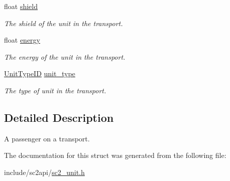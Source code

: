 \begin{DoxyCompactItemize}
float \hyperlink{structsc2_1_1_passenger_unit_a8e79587e7907106cde23a76e2db4d1fd}{shield}
\begin{DoxyCompactList}\small\item\em The shield of the unit in the transport. \end{DoxyCompactList}\item 
\mbox{\label{structsc2_1_1_passenger_unit_a1efad4d291286d5d8a7591fa4c12af4f}} 
float \hyperlink{structsc2_1_1_passenger_unit_a1efad4d291286d5d8a7591fa4c12af4f}{energy}
\begin{DoxyCompactList}\small\item\em The energy of the unit in the transport. \end{DoxyCompactList}\item 
\mbox{\label{structsc2_1_1_passenger_unit_a84f5da3c8a6c163f3b1eb5f0061e5d7e}} 
\hyperlink{classsc2_1_1_s_c2_type}{Unit\+Type\+ID} \hyperlink{structsc2_1_1_passenger_unit_a84f5da3c8a6c163f3b1eb5f0061e5d7e}{unit\+\_\+type}
\begin{DoxyCompactList}\small\item\em The type of unit in the transport. \end{DoxyCompactList}\end{DoxyCompactItemize}


\subsection{Detailed Description}
A passenger on a transport. 

The documentation for this struct was generated from the following file\+:\begin{DoxyCompactItemize}
\item 
include/sc2api/\hyperlink{sc2__unit_8h}{sc2\+\_\+unit.\+h}\end{DoxyCompactItemize}

